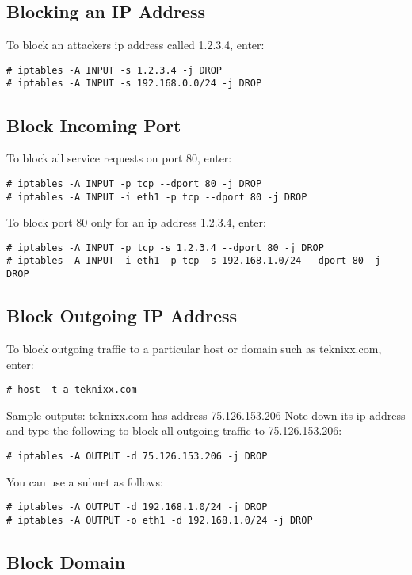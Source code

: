 \subsection{Blocking an IP Address}

To block an attackers ip address called 1.2.3.4, enter:
\begin{verbatim}
# iptables -A INPUT -s 1.2.3.4 -j DROP
# iptables -A INPUT -s 192.168.0.0/24 -j DROP
\end{verbatim}

\subsection{Block Incoming Port}

To block all service requests on port 80, enter:
\begin{verbatim}
# iptables -A INPUT -p tcp --dport 80 -j DROP
# iptables -A INPUT -i eth1 -p tcp --dport 80 -j DROP
\end{verbatim}

To block port 80 only for an ip address 1.2.3.4, enter:
\begin{verbatim}
# iptables -A INPUT -p tcp -s 1.2.3.4 --dport 80 -j DROP
# iptables -A INPUT -i eth1 -p tcp -s 192.168.1.0/24 --dport 80 -j DROP
\end{verbatim}

\subsection{Block Outgoing IP Address}

To block outgoing traffic to a particular host or domain 
such as teknixx.com, enter:
\begin{verbatim}
# host -t a teknixx.com
\end{verbatim}

Sample outputs:
teknixx.com has address 75.126.153.206
Note down its ip address and type the following to block 
all outgoing traffic to 75.126.153.206:
\begin{verbatim}
# iptables -A OUTPUT -d 75.126.153.206 -j DROP
\end{verbatim}

You can use a subnet as follows:
\begin{verbatim}
# iptables -A OUTPUT -d 192.168.1.0/24 -j DROP
# iptables -A OUTPUT -o eth1 -d 192.168.1.0/24 -j DROP
\end{verbatim}

\subsection{Block Domain}

